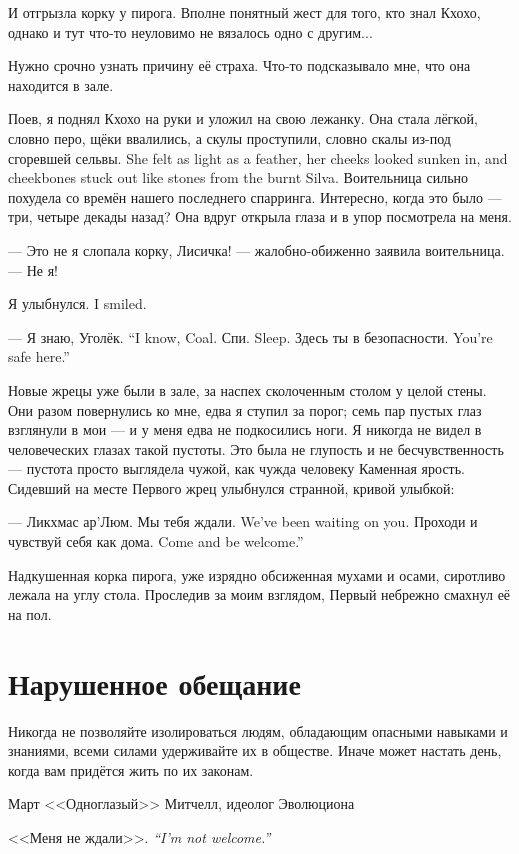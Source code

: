 И отгрызла корку у пирога.
Вполне понятный жест для того, кто знал Кхохо, однако и тут что-то неуловимо не вязалось одно с другим...

Нужно срочно узнать причину её страха.
Что-то подсказывало мне, что она находится в зале.

Поев, я поднял Кхохо на руки и уложил на свою лежанку.
{Она стала лёгкой, словно перо, щёки ввалились, а скулы проступили, словно скалы из-под сгоревшей сельвы.}
{She felt as light as a feather, her cheeks looked sunken in, and cheekbones stuck out like stones from the burnt Silva.}
Воительница сильно похудела со времён нашего последнего спарринга.
Интересно, когда это было --- три, четыре декады назад?
Она вдруг открыла глаза и в упор посмотрела на меня.

--- Это не я слопала корку, Лисичка! --- жалобно-обиженно заявила воительница.
--- Не я!

{Я улыбнулся.}
{I smiled.}

{--- Я знаю, Уголёк.}
{``I know, Coal.}
{Спи.}
{Sleep.}
{Здесь ты в безопасности.}
{You're safe here.''}

Новые жрецы уже были в зале, за наспех сколоченным столом у целой стены.
Они разом повернулись ко мне, едва я ступил за порог;
семь пар пустых глаз взглянули в мои --- и у меня едва не подкосились ноги.
Я никогда не видел в человеческих глазах такой пустоты.
Это была не глупость и не бесчувственность --- пустота просто выглядела чужой, как чужда человеку Каменная ярость.
Сидевший на месте Первого жрец улыбнулся странной, кривой улыбкой:

--- Ликхмас ар'Люм.
{Мы тебя ждали.}
{We've been waiting on you.}
{Проходи и чувствуй себя как дома.}
{Come and be welcome.''}

Надкушенная корка пирога, уже изрядно обсиженная мухами и осами, сиротливо лежала на углу стола.
Проследив за моим взглядом, Первый небрежно смахнул её на пол.

\section{Нарушенное обещание}

\epigraph
{Никогда не позволяйте изолироваться людям, обладающим опасными навыками и знаниями, всеми силами удерживайте их в обществе.
Иначе может настать день, когда вам придётся жить по их законам.}
{Март <<Одноглазый>> Митчелл, идеолог Эволюциона}

{<<Меня не ждали>>.}
{\emph{``I'm not welcome.''}}

